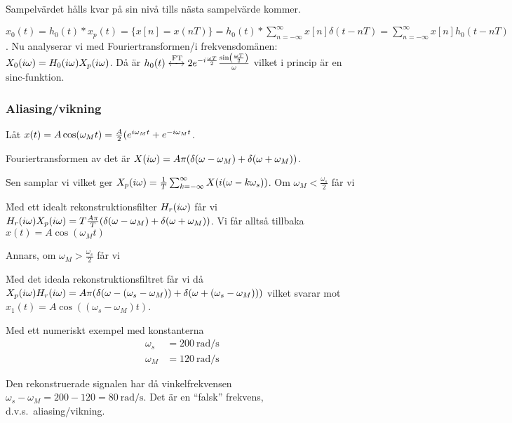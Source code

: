 \documentclass[a4paper]{article}
\begin{document}
\f

Sampelvärdet hålls kvar på sin nivå tills nästa sampelvärde kommer.

\(
    x_0(t) = h_0(t) * x_p(t)
           = \{x[n] = x(nT)\}
           = h_0(t) * \sum_{n=-\infty}^\infty x[n] \delta(t-nT)
           = \sum_{n=-\infty}^\infty x[n] h_0(t-nT)
\). Nu analyserar vi med Fouriertransformen/i frekvensdomänen: \(
    X_0(i\omega) = H_0(i\omega) X_p(i\omega)
\). Då är \(
    h_0(t) \xleftrightarrow{\text{FT}} 2e^{-i \frac{\omega T}{2} } \frac{\sin(\frac{\omega T}{2} )}{\omega} 
\) vilket i princip är en \(
    \text{sinc} 
\)-funktion.

\subsubsection{Aliasing/vikning}
\begin{ex}
    Låt \(
        x(t) = A \cos(\omega_M t) = \frac{A}{2} (e^{i\omega_M t} + e^{-i\omega_M t}
    \).

    Fouriertransformen av det är \(
        X(i\omega) = A \pi (\delta(\omega - \omega_M) + \delta(\omega+\omega_M))
    \).

    \f

    Sen samplar vi vilket ger \(
        X_p(i\omega) = \frac{1}{T} \sum_{k=-\infty}^\infty X(i(\omega - k \omega_s))
    \). Om \(
        \omega_M < \frac{\omega_s}{2} 
    \) får vi 

    \f

    Med ett idealt rekonstruktionsfilter \(
        H_r(i\omega)
    \) får vi \(
        H_r(i\omega) X_p(i\omega) 
            = T \frac{A \pi}{T} (\delta(\omega-\omega_M) + \delta(\omega+\omega_M))
    \). Vi får alltså tillbaka \(
        x(t) = A \cos(\omega_M t)
    \) 

    Annars, om \(
        \omega_M > \frac{\omega_s}{2}
    \) får vi  

    \f

    Med det ideala rekonstruktionsfiltret får vi då \(
        X_p(i\omega) H_r(i\omega) 
            = A \pi (\delta(\omega-(\omega_s-\omega_M)) + \delta(\omega+(\omega_s - \omega_M)))
    \) vilket svarar mot \(
        x_1(t) = A \cos((\omega_s-\omega_M) t)
    \). 

    Med ett numeriskt exempel med konstanterna 
    \begin{align*}
        \omega_s &= \SI{200}{\radian\per\second} \\
        \omega_M &= \SI{120}{\radian\per\second} 
    \end{align*}

    Den rekonstruerade signalen har då vinkelfrekvensen \(
        \omega_s-\omega_M = 200-120= \SI{80}{\radian\per\second}
    \). Det är en \enquote{falsk} frekvens, d.v.s.\ aliasing/vikning.
\end{ex}
\end{document}
